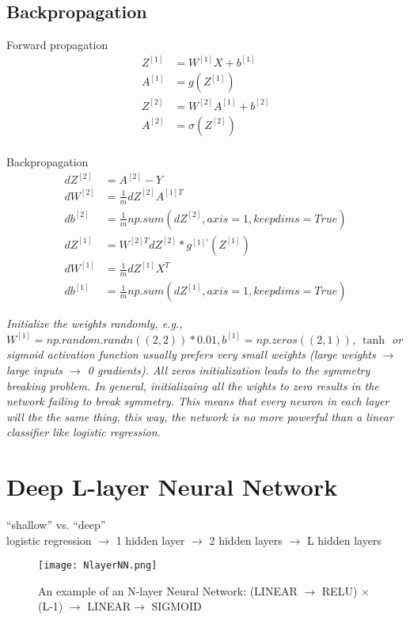 %
\subsection{Backpropagation}

Forward propagation
\begin{align*}
Z^{[1]} &= W^{[1]}X + b^{[1]}\\
A^{[1]} &= g(Z^{[1]})\\
Z^{[2]} &= W^{[2]}A^{[1]}+ b^{[2]}\\
A^{[2]} &= \sigma(Z^{[2]})
\end{align*}
\\
Backpropagation
\begin{align*}
dZ^{[2]}  &= A^{[2]} -Y\\
dW^{[2]} &= \frac{1}{m}dZ^{[2]}A^{[1]T}\\
db^{[2]}  &= \frac{1}{m}np.sum(dZ^{[2]}, axis = 1, keepdims = True)\\
dZ^{[1]}  &= W^{[2]T}dZ^{[2]}*g^{[1]'}(Z^{[1]})\\
dW^{[1]} &= \frac{1}{m}dZ^{[1]}X^{T}\\
db^{[1]}  &= \frac{1}{m}np.sum(dZ^{[1]}, axis = 1, keepdims = True)
\end{align*}

\emph{\textcolor{Bittersweet}{Initialize the weights randomly, e.g., $W^{[1]} = np.random.randn((2,2))*0.01, b^{[1]} = np.zeros((2,1))$, $\tanh$ or sigmoid activation function usually prefers very small weights (large weights $\rightarrow$ large inputs $\rightarrow$ 0 gradients). All zeros initialization leads to the symmetry breaking problem. In general, initializaing all the wights to zero results in the network failing to break symmetry. This means that every neuron in each layer will the the same thing, this way, the network is no more powerful than a linear classifier like logistic regression.}}


\section{Deep L-layer Neural Network}
\label{sec:LNN}

``shallow'' vs. ``deep''\\
logistic regression $\rightarrow$ 1 hidden layer $\rightarrow$ 2 hidden layers $\rightarrow$ L hidden layers
\begin{figure}[h]
    \centering
    \texttt{[image: NlayerNN.png]}
    \caption{An example of an N-layer Neural Network: (LINEAR $\rightarrow$ RELU)  $\times$ (L-1) $\rightarrow$ LINEAR$\rightarrow$ SIGMOID}
    \label{fig:NlayerNN}
\end{figure}

